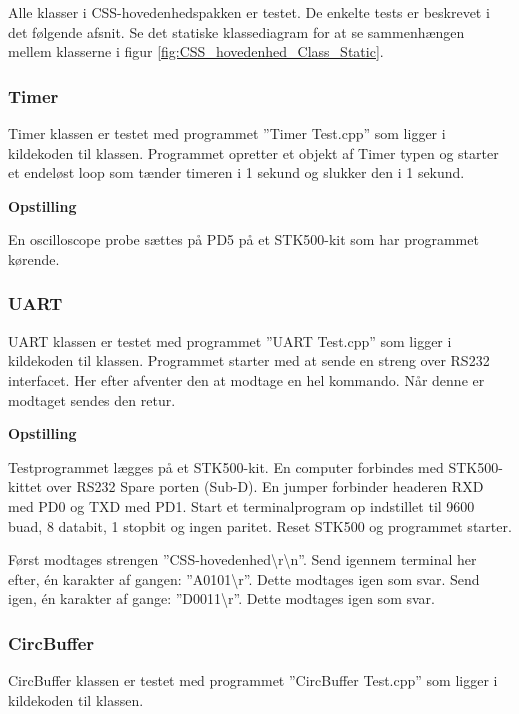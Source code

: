 Alle klasser i CSS-hovedenhedspakken er testet. De enkelte tests er beskrevet i det følgende afsnit.
Se det statiske klassediagram for at se sammenhængen mellem klasserne i figur \ref{fig:CSS_hovedenhed_Class_Static}.

\subsubsection{Timer}
Timer klassen er testet med programmet ''Timer Test.cpp'' som ligger i kildekoden til klassen.
Programmet opretter et objekt af Timer typen og starter et endeløst loop som tænder timeren i 1 sekund og slukker den i 1 sekund.

\textbf{Opstilling}

En oscilloscope probe sættes på PD5 på et STK500-kit som har programmet kørende.




\subsubsection{UART}
UART klassen er testet med programmet ''UART Test.cpp'' som ligger i kildekoden til klassen.
Programmet starter med at sende en streng over RS232 interfacet. Her efter afventer den at modtage en hel kommando. Når denne er modtaget sendes den retur.

\textbf{Opstilling}

Testprogrammet lægges på et STK500-kit.
En computer forbindes med STK500-kittet over RS232 Spare porten (Sub-D).
En jumper forbinder headeren RXD med PD0 og TXD med PD1.
Start et terminalprogram op indstillet til 9600 buad, 8 databit, 1 stopbit og ingen paritet.
Reset STK500 og programmet starter.

Først modtages strengen ''CSS-hovedenhed\textbackslash r\textbackslash n''.
Send igennem terminal her efter, én karakter af gangen: ''A0101\textbackslash r''. Dette modtages igen som svar.
Send igen, én karakter af gange: ''D0011\textbackslash r''. Dette modtages igen som svar.

\subsubsection{CircBuffer}
CircBuffer klassen er testet med programmet ''CircBuffer Test.cpp'' som ligger i kildekoden til klassen.

